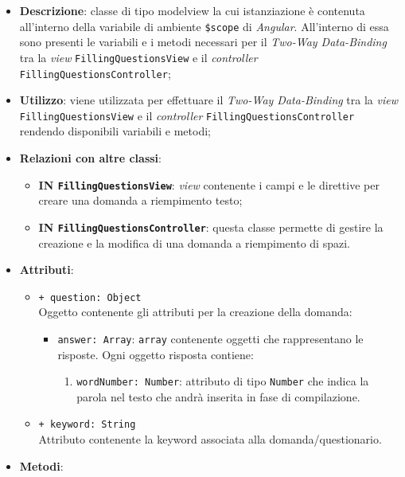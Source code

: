 \begin{itemize}
	\item \textbf{Descrizione}: classe di tipo modelview la cui istanziazione è contenuta all'interno della variabile di ambiente \texttt{\$scope} di \textit{Angular}. All'interno di essa sono presenti le variabili e i metodi necessari per il \textit{Two-Way Data-Binding} tra la \textit{view} \texttt{FillingQuestionsView} e il \textit{controller} \texttt{FillingQuestionsController}; 
	\item \textbf{Utilizzo}: viene utilizzata per effettuare il \textit{Two-Way Data-Binding} tra la \textit{view}\\ \texttt{FillingQuestionsView} e il \textit{controller} \texttt{FillingQuestionsController} rendendo disponibili variabili e metodi;
	\item \textbf{Relazioni con altre classi}:
	\begin{itemize}
		\item \textbf{IN \texttt{FillingQuestionsView}}: \textit{view} contenente i campi e le direttive per creare una domanda a riempimento testo; 
		\item \textbf{IN \texttt{FillingQuestionsController}}: questa classe permette di gestire la creazione e la modifica di una domanda a riempimento di spazi.
	\end{itemize}
	\item \textbf{Attributi}:
	\begin{itemize}
		\item \texttt{+ question: Object} \\ Oggetto contenente gli attributi per la creazione della domanda:
		\begin{itemize}
			\item \texttt{answer: Array}: \texttt{array} contenente oggetti che rappresentano le risposte. Ogni oggetto risposta contiene:
			\begin{enumerate}
				\item \texttt{wordNumber: Number}: attributo di tipo \texttt{Number} che indica la parola nel testo che andrà inserita in fase di compilazione.
			\end{enumerate}
		\end{itemize}
		\item \texttt{+ keyword: String} \\ Attributo contenente la keyword associata alla domanda/questionario.
	\end{itemize}
	\item \textbf{Metodi}:

\end{itemize}

